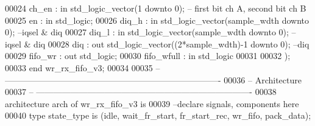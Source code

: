 \begin{DoxyCode}
00024             \textcolor{vhdlchar}{ch_en}           \textcolor{vhdlchar}{:} \textcolor{keywordflow}{in} \textcolor{comment}{std\_logic\_vector}\textcolor{vhdlchar}{(}\textcolor{vhdllogic}{}\textcolor{vhdllogic}{1} \textcolor{keywordflow}{downto} \textcolor{vhdllogic}{}\textcolor{vhdllogic}{0}\textcolor{vhdlchar}{)};\textcolor{keyword}{ -- first bit ch A, second bit ch B}
00025             \textcolor{vhdlchar}{en}              \textcolor{vhdlchar}{:} \textcolor{keywordflow}{in} \textcolor{comment}{std\_logic};
00026             \textcolor{vhdlchar}{diq_h}           \textcolor{vhdlchar}{:} \textcolor{keywordflow}{in} \textcolor{comment}{std\_logic\_vector}\textcolor{vhdlchar}{(}\textcolor{vhdlchar}{sample_wdth} \textcolor{keywordflow}{downto} \textcolor{vhdllogic}{}\textcolor{vhdllogic}{0}\textcolor{vhdlchar}{)};\textcolor{keyword}{    --iqsel & diq}
00027             \textcolor{vhdlchar}{diq_l}           \textcolor{vhdlchar}{:} \textcolor{keywordflow}{in} \textcolor{comment}{std\_logic\_vector}\textcolor{vhdlchar}{(}\textcolor{vhdlchar}{sample_wdth} \textcolor{keywordflow}{downto} \textcolor{vhdllogic}{}\textcolor{vhdllogic}{0}\textcolor{vhdlchar}{)};\textcolor{keyword}{    --iqsel & diq}
00028             \textcolor{vhdlchar}{diq}         \textcolor{vhdlchar}{:} \textcolor{keywordflow}{out} \textcolor{comment}{std\_logic\_vector}\textcolor{vhdlchar}{(}\textcolor{vhdlchar}{(}\textcolor{vhdllogic}{}\textcolor{vhdllogic}{2}\textcolor{vhdlchar}{*}\textcolor{vhdlchar}{sample_wdth}\textcolor{vhdlchar}{)}\textcolor{vhdlchar}{-}\textcolor{vhdllogic}{}\textcolor{vhdllogic}{1} \textcolor{keywordflow}{downto} \textcolor{vhdllogic}{}\textcolor{vhdllogic}{0}\textcolor{vhdlchar}{)};\textcolor{keyword}{ --diq}
00029             \textcolor{vhdlchar}{fifo_wr}     \textcolor{vhdlchar}{:} \textcolor{keywordflow}{out} \textcolor{comment}{std\_logic};
00030             \textcolor{vhdlchar}{fifo_wfull}  \textcolor{vhdlchar}{:} \textcolor{keywordflow}{in} \textcolor{comment}{std\_logic}
00031  
00032         \textcolor{vhdlchar}{)};
00033 \textcolor{keywordflow}{end} \textcolor{vhdlchar}{wr\_rx\_fifo\_v3};
00034 
00035 \textcolor{keyword}{-- ----------------------------------------------------------------------------}
00036 \textcolor{keyword}{-- Architecture}
00037 \textcolor{keyword}{-- ----------------------------------------------------------------------------}
00038 \textcolor{keywordflow}{architecture} arch \textcolor{keywordflow}{of} wr_rx_fifo_v3 is
00039 \textcolor{keyword}{--declare signals,  components here}
00040 \textcolor{keywordflow}{type} \textcolor{vhdlchar}{state_type} \textcolor{keywordflow}{is} \textcolor{vhdlchar}{(}\textcolor{vhdlchar}{idle}\textcolor{vhdlchar}{,} \textcolor{vhdlchar}{wait\_fr\_start}\textcolor{vhdlchar}{,} \textcolor{vhdlchar}{fr\_start\_rec}\textcolor{vhdlchar}{,} \textcolor{vhdlchar}{wr\_fifo}\textcolor{vhdlchar}{,} \textcolor{vhdlchar}{pack\_data}\textcolor{vhdlchar}{)};

\end{DoxyCode}
